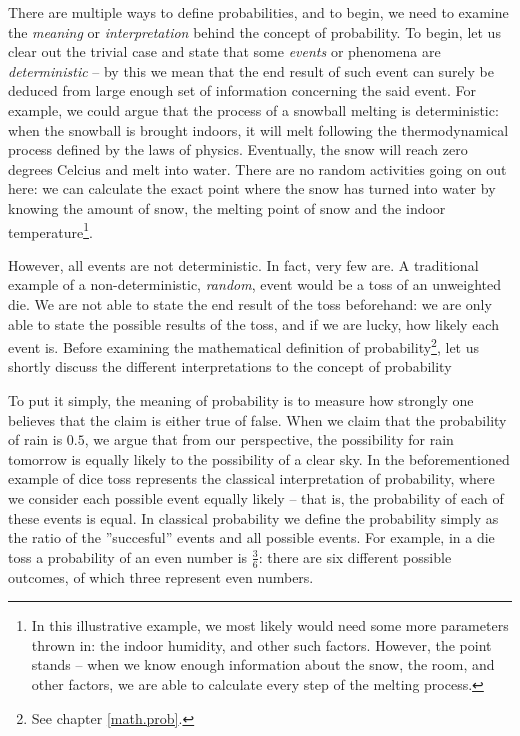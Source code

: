 \documentclass[12pt,a4paper,leqno]{report}
\theoremstyle{plain}
\theoremstyle{definition}
\begin{document}
There are multiple ways to define probabilities, and to begin, we need to examine the \emph{meaning} or \emph{interpretation} behind the concept of probability. To begin, let us clear out the trivial case and state that some \emph{events} or phenomena are \emph{deterministic} -- by this we mean that the end result of such event can surely be deduced from large enough set of information concerning the said event. For example, we could argue that the process of a snowball melting is deterministic: when the snowball is brought indoors, it will melt following the thermodynamical process defined by the laws of physics. Eventually, the snow will reach zero degrees Celcius and melt into water. There are no random activities going on out here: we can calculate the exact point where the snow has turned into water by knowing the amount of snow, the melting point of snow and the indoor temperature\footnote{In this illustrative example, we most likely would need some more parameters thrown in: the indoor humidity, and other such factors. However, the point stands -- when we know enough information about the snow, the room, and other factors, we are able to calculate every step of the melting process.}.

However, all events are not deterministic. In fact, very few are. A traditional example of a non-deterministic, \emph{random}, event would be a toss of an unweighted die. We are not able to state the end result of the toss beforehand: we are only able to state the possible results of the toss, and if we are lucky, how likely each event is. Before examining the mathematical definition of probability\footnote{See chapter \ref{math.prob}.}, let us shortly discuss the different interpretations to the concept of probability

To put it simply, the meaning of probability is to measure how strongly one believes that the claim is either true of false. When we claim that the probability of rain is $0.5$, we argue that from our perspective, the possibility for rain tomorrow is equally likely to the possibility of a clear sky. In the beforementioned example of dice toss represents the classical interpretation of probability, where we consider each possible event equally likely -- that is, the probability of each of these events is equal. In classical probability we define the probability simply as the ratio of the ''succesful'' events and all possible events. For example, in a die toss a probability of an even number is $\frac{3}{6}$: there are six different possible outcomes, of which three represent even numbers.
\end{document}
